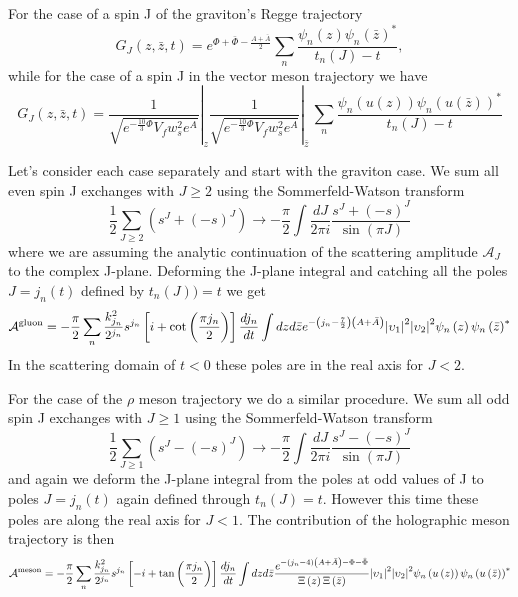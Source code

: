 \documentclass[a4paper,12pt]{article}
\begin{document}
For the case of a spin J of the graviton's Regge trajectory
\begin{equation}
G_J \left(z, \bar{z}, t \right) = e^{\Phi + \bar{\Phi} - \frac{A+\bar{A}}{2}} \sum_n \frac{\psi_n \left(z\right) {\psi_n \left(\bar{z}\right)}^*}{t_n(J) - t},
\end{equation}
while for the case of a spin J in the vector meson trajectory we have
\begin{equation}
G_J \left(z, \bar{z}, t \right)  = \left.\frac{1}{\sqrt{e^{-\frac{10}{3}\Phi} V_f w_s^2 e^A}}\right|_z  \left.\frac{1}{\sqrt{e^{-\frac{10}{3}\Phi} V_f w_s^2 e^A}}\right|_{\bar{z}} \, \sum_n \frac{\psi_n \left(u\left(z\right)\right){\psi_n \left(u\left(\bar{z}\right)\right)}^*}{t_n(J)-t}
\end{equation}

Let's consider each case separately and start with the graviton case. We sum all even spin J exchanges with $J \geqslant 2$ using the Sommerfeld-Watson transform
\begin{equation}
\frac{1}{2} \sum_{J \geqslant 2} \left( s^J + {\left(-s\right)}^J \right) \rightarrow - \frac{\pi}{2} \int \frac{dJ}{2 \pi i} \frac{s^J + {\left(-s\right)}^J}{\sin\left(\pi J\right)}
\end{equation}
where we are assuming the analytic continuation of the scattering amplitude $\mathcal{A}_J$ to the complex J-plane. Deforming the J-plane integral and catching all the poles $J = j_n\left(t\right)$ defined by $t_n\left(J\right) ) = t$ we get
\begin{align}
\mathcal{A}^{\rm {gluon}} = - \frac{\pi}{2} \sum_n \frac{k_{j_n}^2}{2^{j_n}} s^{j_n} \left[i + \cot \left( \frac{\pi j_n}{2} \right) \right] \frac{d j_n}{dt} \int dz d\bar{z} e^{-\left(j_n - \frac{7}{2}\right) \left(A+\bar{A}\right)} {|\upsilon_1|}^2 {|\upsilon_2|}^2 \psi_n \left(z\right) {\psi_n \left(\bar{z}\right)}^*
\end{align}
In the scattering domain of $t < 0$ these poles are in the real axis for $J < 2$. 

For the case of the $\rho$ meson trajectory we do a similar procedure. We sum all odd spin J exchanges with $J \geqslant 1$ using the Sommerfeld-Watson transform
\begin{equation}
\frac{1}{2} \sum_{J \geqslant 1} \left( s^J - {\left(-s\right)}^J \right) \rightarrow - \frac{\pi}{2} \int \frac{dJ}{2 \pi i} \frac{s^J - {\left(-s\right)}^J}{\sin\left(\pi J\right)}
\end{equation}
and again we deform the J-plane integral from the poles at odd values of J to poles $J = j_n\left(t\right)$ again defined through $t_n\left(J\right) = t$. However this time these poles are along the real axis for $J < 1$.
The contribution of the holographic meson trajectory is then
\begin{equation}
\mathcal{A}^{\rm {meson}} = - \frac{\pi}{2} \sum_n \frac{k_{j_n}^2}{2^{j_n}} s^{j_n} \left[-i + \tan \left( \frac{\pi j_n}{2} \right) \right] \frac{d j_n}{dt} \int dz d\bar{z} \frac{e^{-\left(j_n - 4\right) \left(A+\bar{A}\right)-\Phi - \bar{\Phi}}}{\Xi\left(z\right) \Xi\left(\bar{z}\right)} {|\upsilon_1|}^2 {|\upsilon_2|}^2 \psi_n \left(u\left(z\right)\right) {\psi_n \left(u\left(\bar{z}\right)\right)}^*
\end{equation}
\end{document}
